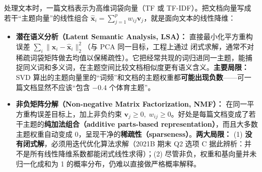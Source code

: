

处理文本时，一篇文档表示为高维词袋向量（TF 或 TF-IDF）。把文档向量写成若干“主题向量”的线性组合 $\hat{\mathbf{x}}_i = \sum_{j=1}^p w_{ij}\mathbf{v}_j$，就是面向文本的线性降维：
\begin{itemize}
\item \textbf{潜在语义分析（Latent Semantic Analysis, LSA）：} 直接最小化平方重构误差 $\sum_i \|\mathbf{x}_i - \hat{\mathbf{x}}_i\|_2^2$（与 PCA 同一目标，工程上通过  闭式求解，通常不对稀疏词袋矩阵做去均值以保稀疏性）。它把经常共现的词归进同一主题，能捕捉同义词和多义词，在主题空间比较文档相似度更有语义含义。\textbf{主要局限：} SVD 算出的主题向量里的“词频”和文档的主题权重都\textbf{可能出现负数}——可一篇文档显然不应该“包含 $-0.4$ 个体育主题”。
\item \textbf{非负矩阵分解（Non-negative Matrix Factorization, NMF）：} 在同一平方重构误差目标上，加上非负约束 $\mathbf{v}_j \ge 0,\; w_{ij} \ge 0$。好处是每篇文档变成了若干主题的\textbf{纯加法组合（additive parts-based representation）}，而且大多数主题权重自动变成 0，呈现干净的\textbf{稀疏性（sparseness）}。\textbf{两大局限：} (1) \textbf{没有闭式解}，必须用迭代优化算法求解（2021B 期末 Q2 选项 C 据此辨析：并不是所有线性降维系数都能闭式线性求得）；(2) 尽管非负，权重和基向量并未归一化成和为 1 的概率分布，仍难以直接做严格概率解释。
\end{itemize}


